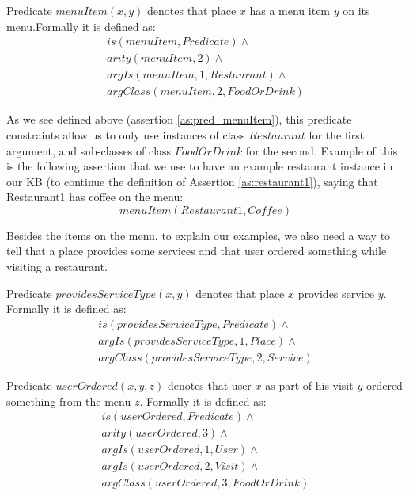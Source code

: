 \begin{definition}\label{def:menuItem}
Predicate $menuItem(x,y)$ denotes that place $x$ has a menu item $y$ on its 
menu.Formally it is defined as:
\begin{equation}\label{as:pred_menuItem}
\begin{gathered}
    is(menuItem,Predicate) \land \\
    arity(menuItem,2) \land \\
	argIs(menuItem,1,Restaurant) \land\\
	argClass(menuItem,2,FoodOrDrink)
\end{gathered}
\end{equation}
\end{definition}
As we see defined above (assertion \ref{as:pred_menuItem}), this predicate
constraints allow us to only use instances of class $Restaurant$ for the first
argument, and sub-classes of class $FoodOrDrink$ for the second. Example of this
is the following assertion that we use to have an example restaurant instance
in our KB (to continue the definition of Assertion \ref{as:restaurant1}), saying
that Restaurant1 has coffee on the menu:
\begin{equation}
menuItem(Restaurant1,Coffee)
\end{equation}

Besides the 
items on the menu, to explain our examples, we also need a way to tell that
a place provides some services and that user ordered something while visiting
a restaurant.

\begin{definition}\label{def:serviceType}
Predicate $providesServiceType(x,y)$ denotes that place $x$ provides service 
$y$. Formally it is defined as:
\begin{equation}\label{as:providesServiceType}
\begin{gathered}
    is(providesServiceType,Predicate) \land \\
	argIs(providesServiceType,1,Place) \land\\
	argClass(providesServiceType,2, Service)
\end{gathered}
\end{equation}
\end{definition}

\begin{definition}\label{def:userOrdered}
Predicate $userOrdered(x,y,z)$ denotes that user $x$ as part of his visit $y$ 
ordered something from the menu $z$. Formally it is defined as:
\begin{equation}\label{as:userOrdered}
\begin{gathered}
    is(userOrdered,Predicate) \land \\
    arity(userOrdered,3) \land \\
	argIs(userOrdered,1,User) \land\\
    argIs(userOrdered,2,Visit) \land \\
	argClass(userOrdered,3, FoodOrDrink)
\end{gathered}
\end{equation}
\end{definition}

